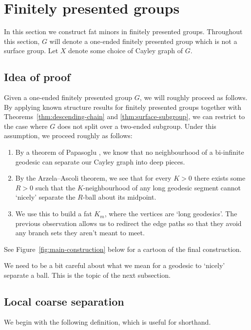 \documentclass[10pt,a4paper]{amsart}
\theoremstyle{definition}
\begin{document}
\section{Finitely presented groups}\label{sec:fp}


In this section we construct fat minors in finitely presented groups. Throughout this section, $G$ will denote a one-ended finitely presented group which is not a surface group. Let $X$ denote some choice of Cayley graph of $G$. 

\subsection{Idea of proof} 

Given a one-ended finitely presented group $G$, we will roughly proceed as follows. By applying known structure results for finitely presented groups together with Theorems~\ref{thm:descending-chain} and \ref{thm:surface-subgroup}, we can restrict to the case where $G$ does not split over a two-ended subgroup. Under this assumption, we proceed roughly as follows:

\begin{enumerate}
	\item By a theorem of Papasoglu \cite{papasoglu2005quasi}, we know that no neighbourhood of a bi-infinite geodesic can separate our Cayley graph into deep pieces.
	\item By the Arzela--Ascoli theorem, we see that for every $K > 0$ there exists some $R > 0$ such that the $K$-neighbourhood of any long geodesic segment cannot `nicely' separate the $R$-ball about its midpoint. 
	\item We use this to build a fat $K_m$, where the vertices are `long geodesics'. The previous observation allows us to redirect the edge paths so that they avoid any branch sets they aren't meant to meet.
\end{enumerate}
See Figure~\ref{fig:main-construction} below for a cartoon of the final construction. 

We need to be a bit careful about what we mean for a geodesic to `nicely' separate a ball. This is the topic of the next subsection. 

\subsection{Local coarse separation}

We begin with the following definition, which is useful for shorthand. 
\end{document}
